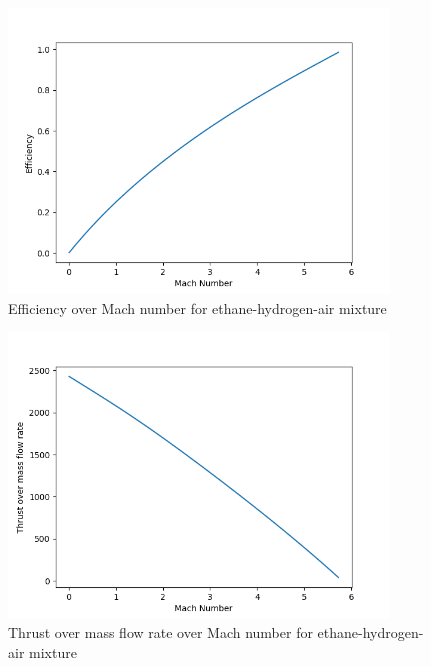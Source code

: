 \documentclass[a4paper,11pt]{article}
\begin{document}
	\begin{figure}[H]
		\centering
		\includegraphics[width=0.9\textwidth]{Wodor(0.5mol)_Etan(1mol)_pow/Efficiency_over_Mach.png}
       		\caption{Efficiency over Mach number for ethane-hydrogen-air mixture}
	\end{figure}
	\begin{figure}[H]
		\centering
		\includegraphics[width=0.9\textwidth]{Wodor(0.5mol)_Etan(1mol)_pow/Thrust_over_mass_flow_rate_over_Mach.png}
       		\caption{Thrust over mass flow rate over Mach number for ethane-hydrogen-air mixture}
	\end{figure}
\end{document}
